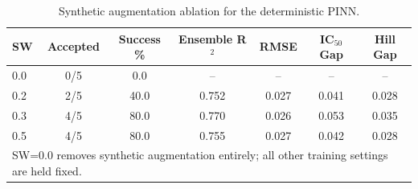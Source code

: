 \begin{table}[htbp]
\centering
\caption{Synthetic augmentation ablation for the deterministic PINN.}
\label{tab:synthetic_ablation}
\begin{tabular}{lcccccc}
\hline
\textbf{SW} & \textbf{Accepted} & \textbf{Success \%} & \textbf{Ensemble R$^2$} & \textbf{RMSE} & \textbf{IC$_{50}$ Gap} & \textbf{Hill Gap} \\
\hline
0.0 & 0/5 & 0.0 & -- & -- & -- & -- \\
0.2 & 2/5 & 40.0 & 0.752 & 0.027 & 0.041 & 0.028 \\
0.3 & 4/5 & 80.0 & 0.770 & 0.026 & 0.053 & 0.035 \\
0.5 & 4/5 & 80.0 & 0.755 & 0.027 & 0.042 & 0.028 \\
\hline
\multicolumn{7}{l}{\small SW=0.0 removes synthetic augmentation entirely; all other training settings are held fixed.} \\
\end{tabular}
\end{table}
